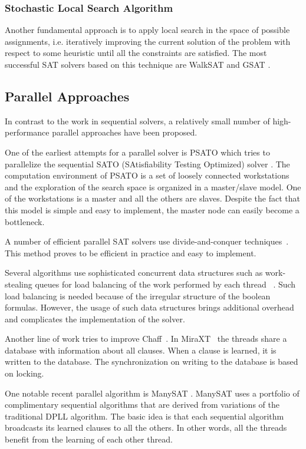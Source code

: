 \documentclass[letterpaper, compsoc, conference]{IEEEtran}
\begin{document}
\subsubsection{Stochastic Local Search Algorithm}
Another fundamental approach is to apply local search in the space of possible
assignments, i.e. iteratively improving the current solution of the
problem with respect to some heuristic until all the constraints are satisfied.
The most successful SAT solvers based on this technique are WalkSAT
\cite{Selman95localsearch} and GSAT \cite{Selman1992}.

\subsection{Parallel Approaches}
In contrast to the work in sequential solvers, a relatively small number of 
high-performance parallel approaches have been proposed.

One of the earliest attempts for a parallel solver is PSATO \cite{PSATO} which tries
to parallelize the sequential SATO (SAtisfiability Testing Optimized) solver
\cite{Zhang94sato}. The computation environment of PSATO is a set of loosely connected 
workstations and the exploration of the search space is organized in a master/slave 
model. One of the workstations is a master and all the others are slaves. Despite 
the fact that this model is simple and easy to implement, the master node can easily 
become a bottleneck.

A number of efficient parallel SAT solvers use divide-and-conquer 
techniques~\cite{PMiniSat, Bohm96, Lewis2007MiraXT, Gil08Pmsat}. This method
proves to be efficient in practice and easy to implement. 

Several algorithms use sophisticated concurrent data structures such
as work-stealing queues for load balancing of the work performed by each thread
~\cite{Jurkowiak2005,PMiniSat}. Such load balancing is needed because of the 
irregular structure of the boolean formulas. However, the usage of such data 
structures brings additional overhead and complicates the implementation of the
solver.

Another line of work tries to improve Chaff~\cite{Chrabakh03gradsat, 
Lewis2007MiraXT}. In MiraXT~\cite{Lewis2007MiraXT} the threads share a database with 
information about all clauses. When a clause is learned, it is written to the
database. The synchronization on writing to the database is based on locking.

One notable recent parallel algorithm is ManySAT \citep{ManySAT}.
ManySAT uses a portfolio of complimentary sequential algorithms that are
derived from variations of the traditional DPLL algorithm. The basic idea is
that each sequential algorithm broadcasts its learned clauses to all the
others. In other words, all the threads benefit from the learning of each
other thread.
\end{document}

